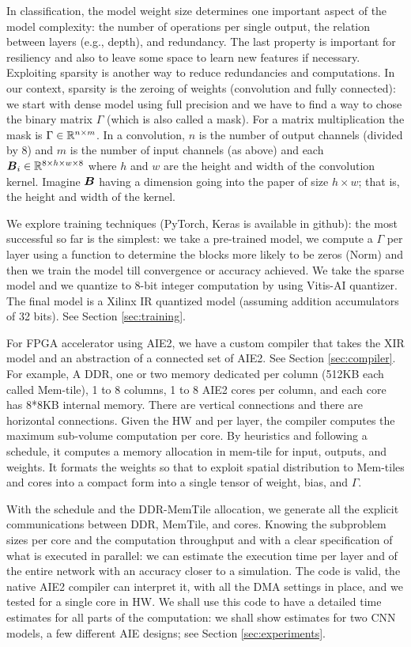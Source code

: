 \documentclass[conference]{IEEEtran}
\begin{document}
In classification, the model weight size determines one important
aspect of the model complexity: the number of operations per single
output, the relation between layers (e.g., depth), and redundancy. The
last property is important for resiliency and also to leave some space
to learn new features if necessary. Exploiting sparsity is another way
to reduce redundancies and computations. In our context, sparsity is
the zeroing of weights (convolution and fully connected): we start
with dense model using full precision and we have to find a way to
chose the binary matrix $\Gamma$ (which is also called a mask). For a
matrix multiplication the mask is $\Gamma \in \mathbb{R}^{n\times m}$. In a
convolution, $n$ is the number of output channels (divided by 8) and
$m$ is the number of input channels (as above) and each ${\boldsymbol B}_i \in
\mathbb{R}^{8\times h \times w \times 8}$ where $h$ and $w$ are the height and
width of the convolution kernel. Imagine ${\boldsymbol B}$ having a dimension
going into the paper of size $h \times w$; that is, the height and
width of the kernel.

We explore training techniques (PyTorch, Keras is available in
github): the most successful so far is the simplest: we take a
pre-trained model, we compute a $\Gamma$ per layer using a function to
determine the blocks more likely to be zeros (Norm) and then we train
the model till convergence or accuracy achieved. We take the sparse
model and we quantize to 8-bit integer computation by using Vitis-AI
quantizer. The final model is a Xilinx IR quantized model (assuming addition
accumulators of 32 bits). See Section \ref{sec:training}.

For FPGA accelerator using AIE2, we have a custom compiler that takes
the XIR model and an abstraction of a connected set of AIE2. See
Section \ref{sec:compiler}. For example, A DDR, one or two memory
dedicated per column (512KB each called Mem-tile), 1 to 8 columns, 1
to 8 AIE2 cores per column, and each core has 8*8KB internal
memory. There are vertical connections and there are horizontal
connections. Given the HW and per layer, the compiler computes the
maximum sub-volume computation per core. By heuristics and following a
schedule, it computes a memory allocation in mem-tile for input,
outputs, and weights. It formats the weights so that to exploit
spatial distribution to Mem-tiles and cores into a compact form into a
single tensor of weight, bias, and $\Gamma$.

With the schedule and the DDR-MemTile allocation, we generate all the
explicit communications between DDR, MemTile, and cores. Knowing the
subproblem sizes per core and the computation throughput and with a
clear specification of what is executed in parallel: we can estimate
the execution time per layer and of the entire network with an
accuracy closer to a simulation. The code is valid, the native AIE2
compiler can interpret it, with all the DMA settings in place, and we
tested for a single core in HW.  We shall use this code to have a
detailed time estimates for all parts of the computation: we shall
show estimates for two CNN models, a few different AIE designs; see
Section \ref{sec:experiments}.
\end{document}
